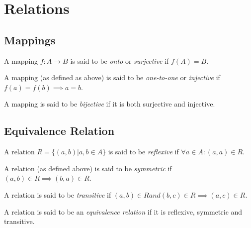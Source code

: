 \chapter{Relations}

\section{Mappings}

A mapping $f : A \rightarrow B$ is said to be \emph{onto} or
\emph{surjective} if $ f(A) = B $.

A mapping (as defined as above) is said to be \emph{one-to-one} or
\emph{injective} if $ f(a) = f(b) \implies a = b $.

A mapping is said to be \emph{bijective} if it is both surjective and
injective.

\section{Equivalence Relation}

A relation $ R = \{ (a,b) | a,b \in A \} $ is said to be
\emph{reflexive} if $ \forall a \in A: (a,a) \in R $.

A relation (as defined above) is said to be \emph{symmetric} if $
(a,b) \in R \implies (b,a) \in R $.

A relation is said to be \emph{transitive} if $ (a,b) \in R and (b,c)
\in R \implies (a,c) \in R $.

A relation is said to be an \emph{equivalence relation} if it is
reflexive, symmetric and transitive.

